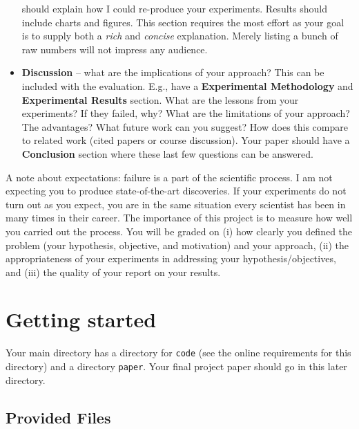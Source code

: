 \documentclass{article}
\begin{document}
\begin{itemize}
    should explain how I could re-produce your experiments.  Results
    should include charts and figures.  This section requires the most effort
    as your goal is to supply both a {\it rich} and {\it concise} explanation.
    Merely listing a bunch of raw numbers will not impress any audience.
  \item {\bf Discussion} -- what are the implications of your approach?  This
    can be included with the evaluation.  E.g., have a {\bf Experimental Methodology}
    and {\bf Experimental Results} section.  What are the lessons from your
    experiments?  If they failed, why? What are the limitations of your approach?
    The advantages?  What future work can you suggest?  How does this compare
    to related work (cited papers or course discussion).  Your paper should
    have a {\bf Conclusion} section where these last few questions can be answered.
\end{itemize}

A note about expectations: failure is a part of the scientific process.  I am
not expecting you to produce state-of-the-art discoveries.  If your experiments
do not turn out as you expect, you are in the same situation every scientist
has been in many times in their career. The importance of this project is
to measure how well you carried out the process.  You will be graded on (i) how
clearly you defined the problem (your hypothesis, objective, and motivation)
and your approach, (ii) the appropriateness of your experiments in addressing
your hypothesis/objectives, and (iii) the quality of your report on your results.

\section{Getting started}

Your main directory has a directory for {\tt code} (see the online requirements for this directory) and a directory {\tt paper}.  Your final project paper
should go in this later directory.

\subsection{Provided Files}
\end{document}
